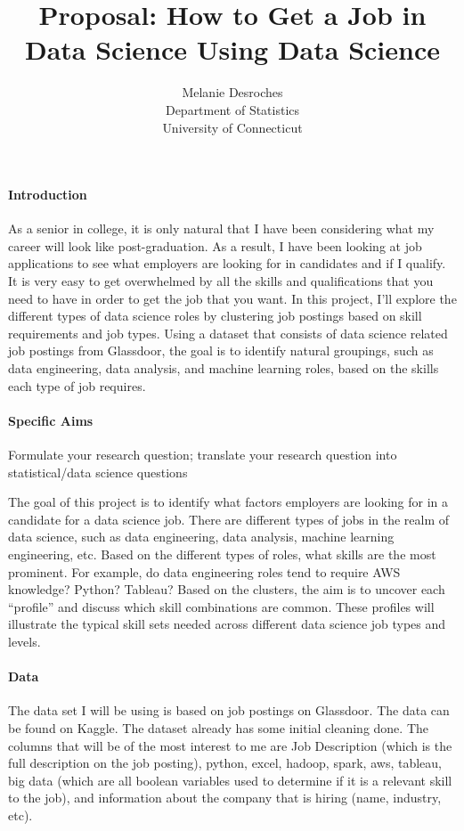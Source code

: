 \documentclass[12pt]{article}
\title{Proposal: How to Get a Job in Data Science Using Data Science}
\author{Melanie Desroches\\
  Department of Statistics\\
  University of Connecticut
}
\begin{document}
\maketitle


\paragraph{Introduction}


As a senior in college, it is only natural that I have been considering what my career will look like post-graduation.
As a result, I have been looking at job applications to see what employers are looking for in candidates and if I qualify. 
It is very easy to get overwhelmed by all the skills and qualifications that you need to have in order to get the job that 
you want. In this project, I’ll explore the different types of data science roles by clustering job postings based on skill 
requirements and job types. Using a dataset that consists of data science related job postings from Glassdoor, the goal is to
identify natural groupings, such as data engineering, data analysis, and machine learning roles, based on the skills each type 
of job requires.

\paragraph{Specific Aims}
Formulate your research question;
translate your research question into statistical/data science questions

The goal of this project is to identify what factors employers are looking for in a candidate for a data science job.
There are different types of jobs in the realm of data science, such as data engineering, data analysis, machine learning 
engineering, etc. Based on the different types of roles, what skills are the most prominent. For example, do data engineering
roles tend to require AWS knowledge? Python? Tableau? Based on the clusters, the aim is to uncover each “profile” and discuss 
which skill combinations are common. These profiles will illustrate the typical skill sets needed across different data science job types 
and levels.

\paragraph{Data}

The data set I will be using is based on job postings on Glassdoor. The data can be found on Kaggle. The dataset already has
some initial cleaning done. The columns that will be of the most interest to me are Job Description (which is the full description
on the job posting), python, excel, hadoop, spark, aws, tableau, big data (which are all boolean variables used to determine
if it is a relevant skill to the job), and information about the company that is hiring (name, industry, etc).
\end{document}
